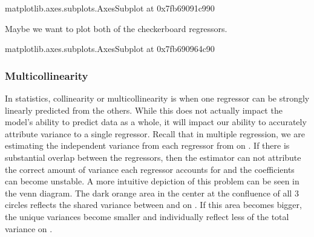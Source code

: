 \documentclass[letterpaper,10pt,english]{sphinxmanual}
\begin{document}
\begin{sphinxVerbatim}[commandchars=\\\{\}]
\PYGZlt{}matplotlib.axes.\PYGZus{}subplots.AxesSubplot at 0x7fb69091c990\PYGZgt{}
\end{sphinxVerbatim}

\noindent{}

Maybe we want to plot both of the checkerboard regressors.

\begin{sphinxVerbatim}[commandchars=\\\{\}]
  
\PYG{p}{[}\PYG{p}{[}\PYG{p}{]}\PYG{p}{]}
\end{sphinxVerbatim}

\begin{sphinxVerbatim}[commandchars=\\\{\}]
\PYGZlt{}matplotlib.axes.\PYGZus{}subplots.AxesSubplot at 0x7fb690964c90\PYGZgt{}
\end{sphinxVerbatim}

\noindent{}


\subsubsection{Multicollinearity}
\label{\detokenize{content/GLM_Single_Subject_Model:multicollinearity}}
In statistics, collinearity or multicollinearity is when one regressor can be strongly linearly predicted from the others. While this does not actually impact the model’s ability to predict data as a whole, it will impact our ability to accurately attribute variance to a single regressor. Recall that in multiple regression, we are estimating the independent variance from each regressor from  on . If there is substantial overlap between the regressors, then the estimator can not attribute the correct amount of variance each regressor accounts for  and the coefficients can become unstable. A more intuitive depiction of this problem can be seen in the venn diagram. The dark orange area in the center at the confluence of all 3 circles reflects the shared variance between  and  on . If this area becomes bigger, the unique variances become smaller and individually reflect less of the total variance on .
\end{document}
